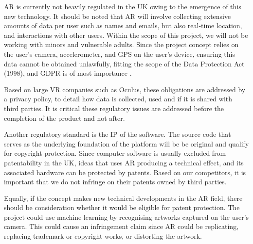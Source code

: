 
{
AR is currently not heavily regulated in the UK owing to the emergence of this new technology. It should be noted that AR will involve collecting extensive amounts of data per user such as names and emails, but also real-time location, and interactions with other users. Within the scope of this project, we will not be working with minors and vulnerable adults. Since the project concept relies on the user's camera, accelerometer, and GPS on the user's device, ensuring this data cannot be obtained unlawfully, fitting the scope of the Data Protection Act (1998), and GDPR is of most importance \cite{ITProPortal}.

Based on large VR companies such as Oculus, these obligations are addressed by a privacy policy, to detail how data is collected, used and if it is shared with third parties. It is critical these regulatory issues are addressed before the completion of the product and not after.

Another regulatory standard is the IP of the software. The source code that serves as the underlying foundation of the platform will be be original and qualify for copyright protection. Since computer software is usually excluded from patentability in the UK, ideas that uses AR producing a technical effect, and its associated hardware can be protected by patents. Based on our competitors, it is important that we do not infringe on their patents owned by third parties.

Equally, if the concept makes new technical developments in the AR field, there should be consideration whether it would be eligible for patent protection. The project could use machine learning by recognising artworks captured on the user's camera. This could cause an infringement claim since AR could be replicating, replacing trademark or copyright works, or distorting the artwork.

}